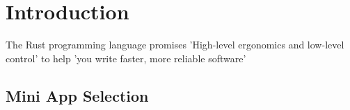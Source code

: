 \chapter{Introduction}
The Rust programming language promises 'High-level ergonomics and low-level control' to help 'you write faster, more reliable software' \cite{RustBook}

\section{Mini App Selection}

